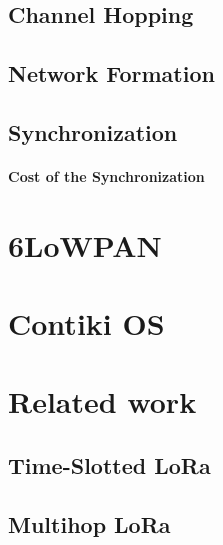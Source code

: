 \subsection{Channel Hopping}

\subsection{Network Formation}

\subsection{Synchronization}

\paragraph{Cost of the Synchronization}


\section{6LoWPAN}


\section{Contiki OS}

\section{Related work}

\subsection{Time-Slotted LoRa}

\subsection{Multihop LoRa}


